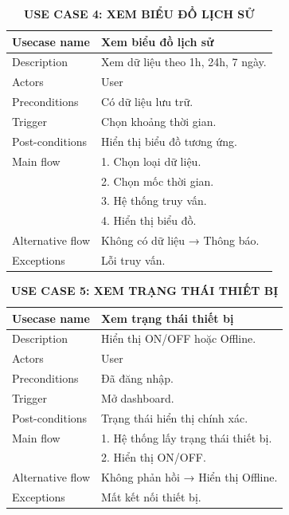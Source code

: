 \begin{table}[H]
\centering
\caption*{\textbf{USE CASE 4: XEM BIỂU ĐỒ LỊCH SỬ}}
\renewcommand{\arraystretch}{1.3}
\begin{tabular}{|p{4cm}|p{11cm}|}
\hline
Usecase name & Xem biểu đồ lịch sử \\
\hline
Description & Xem dữ liệu theo 1h, 24h, 7 ngày. \\
\hline
Actors & User \\
\hline
Preconditions & Có dữ liệu lưu trữ. \\
\hline
Trigger & Chọn khoảng thời gian. \\
\hline
Post-conditions & Hiển thị biểu đồ tương ứng. \\
\hline
Main flow & 
1. Chọn loại dữ liệu.\\ &
2. Chọn mốc thời gian.\\ &
3. Hệ thống truy vấn.\\ &
4. Hiển thị biểu đồ. \\
\hline
Alternative flow & Không có dữ liệu → Thông báo. \\
\hline
Exceptions & Lỗi truy vấn. \\
\hline
\end{tabular}
\end{table}
\begin{table}[H]
\centering
\caption*{\textbf{USE CASE 5: XEM TRẠNG THÁI THIẾT BỊ}}
\renewcommand{\arraystretch}{1.3}
\begin{tabular}{|p{4cm}|p{11cm}|}
\hline
Usecase name & Xem trạng thái thiết bị \\
\hline
Description & Hiển thị ON/OFF hoặc Offline. \\
\hline
Actors & User \\
\hline
Preconditions & Đã đăng nhập. \\
\hline
Trigger & Mở dashboard. \\
\hline
Post-conditions & Trạng thái hiển thị chính xác. \\
\hline
Main flow & 
1. Hệ thống lấy trạng thái thiết bị.\\ &
2. Hiển thị ON/OFF. \\
\hline
Alternative flow & Không phản hồi → Hiển thị Offline. \\
\hline
Exceptions & Mất kết nối thiết bị. \\
\hline
\end{tabular}
\end{table}
